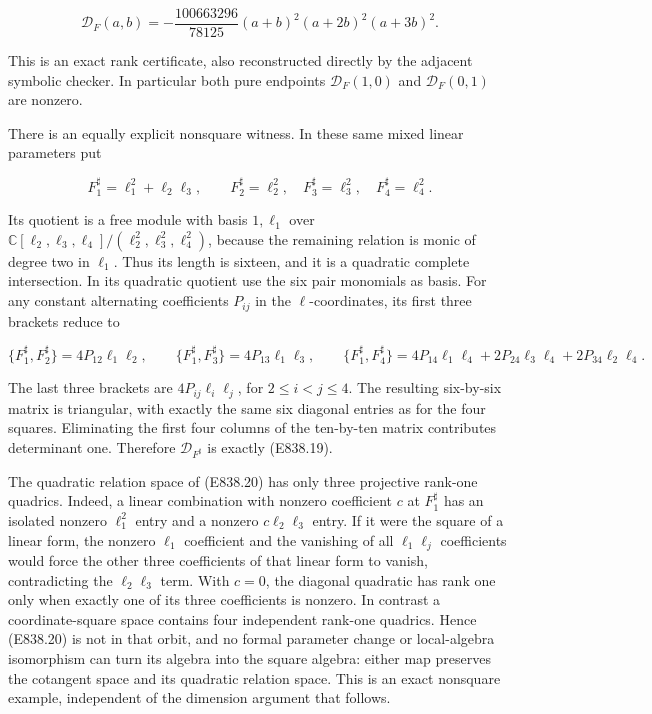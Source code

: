 \[
 \mathcal D_F(a,b)
   =-\frac{100663296}{78125}
       (a+b)^2(a+2b)^2(a+3b)^2.
 \tag{E838.19}
\]

This is an exact rank certificate, also reconstructed directly by the
adjacent symbolic checker. In particular both pure endpoints
\(\mathcal D_F(1,0)\) and \(\mathcal D_F(0,1)\) are nonzero.

There is an equally explicit nonsquare witness. In these same mixed
linear parameters put

\[
 F^\sharp_1=\ell_1^2+\ell_2\ell_3,\qquad
 F^\sharp_2=\ell_2^2,\quad F^\sharp_3=\ell_3^2,\quad
 F^\sharp_4=\ell_4^2.
 \tag{E838.20}
\]

Its quotient is a free module with basis \(1,\ell_1\) over
\(\mathbb C[\ell_2,\ell_3,\ell_4]/(\ell_2^2,\ell_3^2,\ell_4^2)\),
because the remaining relation is monic of degree two in \(\ell_1\).
Thus its length is sixteen, and it is a quadratic complete intersection.
In its quadratic quotient use the six pair monomials as basis. For any
constant alternating coefficients \(P_{ij}\) in the
\(\ell\)-coordinates, its first three brackets reduce to

\[
 \{F^\sharp_1,F^\sharp_2\}=4P_{12}\ell_1\ell_2,\qquad
 \{F^\sharp_1,F^\sharp_3\}=4P_{13}\ell_1\ell_3,\qquad
 \{F^\sharp_1,F^\sharp_4\}
   =4P_{14}\ell_1\ell_4
      +2P_{24}\ell_3\ell_4+2P_{34}\ell_2\ell_4.
 \tag{E838.21}
\]

The last three brackets are \(4P_{ij}\ell_i\ell_j\), for
\(2\le i<j\le4\). The resulting six-by-six matrix is triangular, with
exactly the same six diagonal entries as for the four squares.
Eliminating the first four columns of the ten-by-ten matrix contributes
determinant one. Therefore \(\mathcal D_{F^\sharp}\) is exactly
(E838.19).

The quadratic relation space of (E838.20) has only three projective
rank-one quadrics. Indeed, a linear combination with nonzero coefficient
\(c\) at \(F^\sharp_1\) has an isolated nonzero \(\ell_1^2\) entry and a
nonzero \(c\ell_2\ell_3\) entry. If it were the square of a linear form,
the nonzero \(\ell_1\) coefficient and the vanishing of all
\(\ell_1\ell_j\) coefficients would force the other three coefficients
of that linear form to vanish, contradicting the \(\ell_2\ell_3\) term.
With \(c=0\), the diagonal quadratic has rank one only when exactly one
of its three coefficients is nonzero. In contrast a coordinate-square
space contains four independent rank-one quadrics. Hence (E838.20) is
not in that orbit, and no formal parameter change or local-algebra
isomorphism can turn its algebra into the square algebra: either map
preserves the cotangent space and its quadratic relation space. This is
an exact nonsquare example, independent of the dimension argument that
follows.

